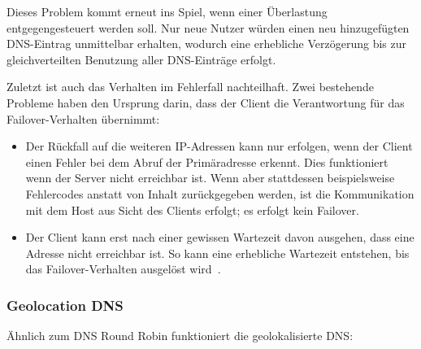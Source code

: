 Dieses Problem kommt erneut ins Spiel, wenn einer Überlastung entgegengesteuert werden soll.
Nur neue Nutzer würden einen neu hinzugefügten DNS-Eintrag unmittelbar erhalten, wodurch eine erhebliche Verzögerung bis zur gleichverteilten Benutzung aller DNS-Einträge erfolgt.

Zuletzt ist auch das Verhalten im Fehlerfall nachteilhaft.
Zwei bestehende Probleme haben den Ursprung darin, dass der Client die Verantwortung für das Failover-Verhalten übernimmt:
\begin{itemize}
	\item Der Rückfall auf die weiteren IP-Adressen kann nur erfolgen, wenn der Client einen Fehler bei dem Abruf der Primäradresse erkennt. Dies funktioniert wenn der Server nicht erreichbar ist. Wenn aber stattdessen beispielsweise Fehlercodes anstatt von Inhalt zurückgegeben werden, ist die Kommunikation mit dem Host aus Sicht des Clients erfolgt; es erfolgt kein Failover.
	\item Der Client kann erst nach einer gewissen Wartezeit davon ausgehen, dass eine Adresse nicht erreichbar ist. So kann eine erhebliche Wartezeit entstehen, bis das Failover-Verhalten ausgelöst wird~\cite{so-dns-slow}.%
\end{itemize}

\subsubsection{Geolocation DNS}
Ähnlich zum DNS Round Robin funktioniert die geolokalisierte DNS: 






